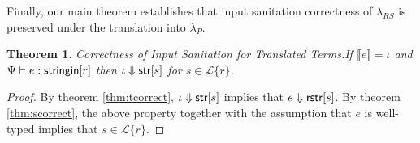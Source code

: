 \documentclass[9pt]{sig-alternate}
\newtheorem{thm}{Theorem}
\theoremstyle{definition}
\newcommand{\Lagr}{\mathcal{L}}
\newcommand{\lang}[1]{\Lagr\{#1\}}
\newcommand{\lambdas}{\lambda_{RS}}
\newcommand{\lambdap}{\lambda_P}
\newcommand{\sistr}[1]{{\sf rstr}[#1]}   \newcommand{\rstr}[1]{{\sf rstr}[#1]} %
\newcommand{\strin}[1]{\sistr{#1}}
\newcommand{\stringin}[1]{{\sf stringin}[#1]}
\renewcommand{\tstr}[1]{{{\sf str}[#1]}}
\newcommand{\str}{{\sf string}}
\newcommand{\err}{\ {\sf err}}
\newcommand{\trden}[1]{\llbracket #1 \rrbracket} %
\newcommand{\treduces}{ \Downarrow }
\newcommand{\sreduces}{ \Downarrow }
\begin{document}
Finally, our main theorem establishes that input sanitation correctness of $\lambdas$ is preserved under the translation into $\lambdap$.

\begin{thm}{Correctness of Input Sanitation for Translated Terms.}\label{thm:main}
  If $\trden{e} = \iota$ and $\sctx \vdash e : \stringin{r}$ then $\iota \sreduces \tstr{s}$
  for $s \in \lang{r}$.
\end{thm}
\begin{proof}
  By theorem \ref{thm:tcorrect}, $\iota \sreduces \tstr{s}$ implies that $e \sreduces \strin{s}$.
  By theorem \ref{thm:scorrect}, the above property together with the assumption that $e$ is well-typed implies that $s \in \lang{r}$.
\end{proof}
%
%
%
\end{document}
